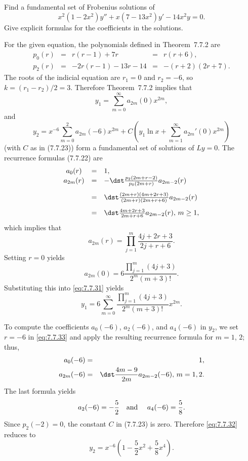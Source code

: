 \setcounter{example}{3}
\begin{example}
  \label{example:7.7.4} \rm Find a fundamental set of Frobenius solutions of
  \[
    x^{2}(1-2x^{2})y''+x(7-13x^{2})y'-14x^{2}y=0.
  \]
  Give explicit formulas for the coefficients in the solutions.
\end{example}
\setcounter{equation}{30}
\begin{examplesolution}
\solution For the given equation, the polynomials defined in Theorem~7.7.2 are
\[
  \begin{array}{ccccc}
    p_{0}(r) & = & r(r-1)+7r       & = & r(r+6),       \\[5pt]
    p_{2}(r) & = & -2r(r-1)-13r-14 & = & -(r+2)(2r+7).
  \end{array}
\]
The roots of the indicial equation are $r_{1}=0$ and $r_{2}=-6$, so $k=(r_{1}-r_{2})/2=3$. Therefore
Theorem~7.7.2 implies that
\begin{equation}
  \label{eq:7.7.31}y_{1}=\sum_{m=0}^{\infty}a_{2m}(0)x^{2m},
\end{equation}
and
\begin{equation}
  \label{eq:7.7.32}y_{2}=x^{-6}\sum_{m=0}^{2}a_{2m}(-6)x^{2m}+C\left(y_{1}\ln x+\sum_{m=1}^{\infty}a_{2m}'(0)x^{2m}\right)
\end{equation}
(with $C$ as in \textup{(7.7.23)}) form a fundamental set of solutions of $Ly=0$. The recurrence
formulas \textup{(7.7.22)} are
\begin{equation}
  \label{eq:7.7.33}
  \begin{array}{ccl}
    a_{0}(r)  & = & 1,                                                    \\
    a_{2m}(r) & = & -\dst\frac{p_{2}(2m+r-2)}{p_{0}(2m+r)}a_{2m-2}(r)     \\[10pt]
              & = & \dst\frac{(2m+r)(4m+2r+3)}{(2m+r)(2m+r+6)}a_{2m-2}(r) \\[10pt]
              & = & \dst\frac{4m+2r+3}{2m+r+6}a_{2m-2}(r),\,m\ge1,
  \end{array}
\end{equation}
which implies that
\[
  a_{2m}(r)=\prod_{j=1}^{m}\frac{4j+2r+3}{2j+r+6}.
\]
Setting $r=0$ yields
\[
  a_{2m}(0)=6{\frac{\prod_{j=1}^{m}(4j+3)}{2^{m}(m+3)!}}.
\]
Substituting this into \eqref{eq:7.7.31} yields
\[
  y_{1}=6\sum_{m=0}^{\infty}\frac{\prod_{j=1}^{m}(4j+3)}{2^{m}(m+3)!}x^{2m}.
\]

To compute the coefficients $a_{0}(-6)$, $a_{2}(-6)$, and $a_{4}(-6)$ in $y_{2}$, we set $r=-6$ in
\eqref{eq:7.7.33} and apply the resulting recurrence formula for $m=1$, $2$; thus,
\begin{eqnarray*}
  a_{0}(-6)  & = & 1, \\
  a_{2m}(-6) & = & \dst\frac{4m-9}{2m}a_{2m-2}(-6),\,m=1,2.
\end{eqnarray*}
The last formula yields
\[
  a_{2}(-6)=-\frac{5}{2}\text{\quad and \quad}a_{4}(-6)=\frac{5}{8}.
\]
Since $p_{2}(-2)=0$, the constant $C$ in \textup{(7.7.23)} is zero. Therefore \eqref{eq:7.7.32}
reduces to
\[
  y_{2}=x^{-6}\left(1-\frac{5}{2}x^{2}+\frac{5}{8}x^{4}\right).
\]
\end{examplesolution}

